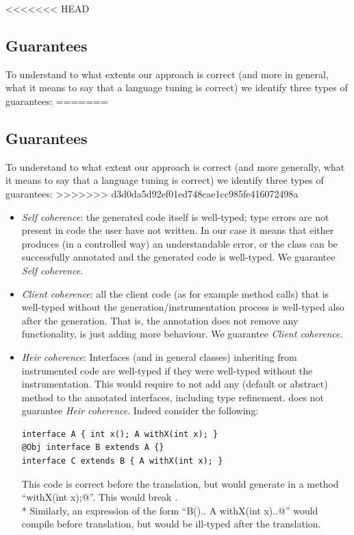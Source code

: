 <<<<<<< HEAD

\subsection{Guarantees}
To understand to what extents our approach is correct (and more in general, what it means to say that a language tuning is correct) we identify three types of guarantees:
=======
\subsection{Guarantees}
To understand to what extent our approach is correct (and more generally, what it means to say that a language tuning is correct) we identify three types of guarantees:
>>>>>>> d3d0da5d92ef01ed748cae1cc985fe416072498a
\begin{itemize}
\item \textit{Self coherence}: the generated code itself is well-typed; type errors are not present in code the user have not written.
In our case it means that either \mixin{} produces (in a controlled way) an understandable error, or the class can be successfully annotated and the generated code is well-typed.
We guarantee \textit{Self coherence}.

\item \textit{Client coherence}: all the client code (as for example method calls) that is well-typed without the generation/instrumentation process is well-typed also after the generation.
That is, the annotation does not remove any functionality, is just
adding more behaviour.
We guarantee \textit{Client coherence}.

\item \textit{Heir coherence}: Interfaces (and in general classes) inheriting from instrumented code are well-typed if they were well-typed without the instrumentation.
This would require to not add any (default or abstract) method to the annotated interfaces, including type refinement.
\mixin  does not guarantee \textit{Heir coherence}.
Indeed consider the following:

\begin{lstlisting}
interface A { int x(); A withX(int x); }
@Obj interface B extends A {}
interface C extends B { A withX(int x); }
\end{lstlisting}

\noindent This code is correct before the translation, but \mixin would  generate in \Q@B@  a method ``\Q@B withX(int x);@''.
This would break \Q@C@. \\*
Similarly, an expression of the form ``\Q@new B(){.. A withX(int x){..}}@'' would compile before translation, but would be ill-typed after the translation.
\end{itemize}

